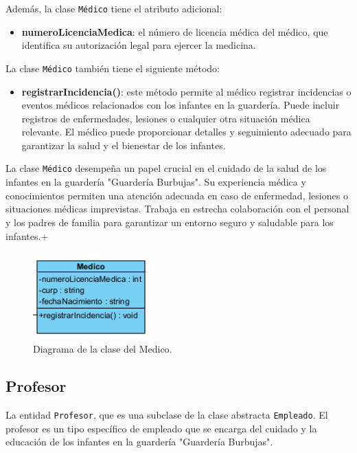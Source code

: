 Además, la clase \texttt{Médico} tiene el atributo adicional:

\begin{itemize}
\item \textbf{numeroLicenciaMedica}: el número de licencia médica del médico, que identifica su autorización legal para ejercer la medicina.
\end{itemize}

La clase \texttt{Médico} también tiene el siguiente método:

\begin{itemize}
\item \textbf{registrarIncidencia()}: este método permite al médico registrar incidencias o eventos médicos relacionados con los infantes en la guardería. Puede incluir registros de enfermedades, lesiones o cualquier otra situación médica relevante. El médico puede proporcionar detalles y seguimiento adecuado para garantizar la salud y el bienestar de los infantes.
\end{itemize}

La clase \texttt{Médico} desempeña un papel crucial en el cuidado de la salud de los infantes en la guardería "Guardería Burbujas". Su experiencia médica y conocimientos permiten una atención adecuada en caso de enfermedad, lesiones o situaciones médicas imprevistas. Trabaja en estrecha colaboración con el personal y los padres de familia para garantizar un entorno seguro y saludable para los infantes.+

\begin{figure}[htbp]
\centering
\includegraphics[width=0.4\textwidth]{images/arqui/medico.png}
\caption{Diagrama de la clase del Medico.}
\label{fig:entidadMedico}
\end{figure}

\clearpage
\subsection{Profesor}
La entidad \texttt{Profesor}, que es una subclase de la clase abstracta \texttt{Empleado}. El profesor es un tipo específico de empleado que se encarga del cuidado y la educación de los infantes en la guardería "Guardería Burbujas".

